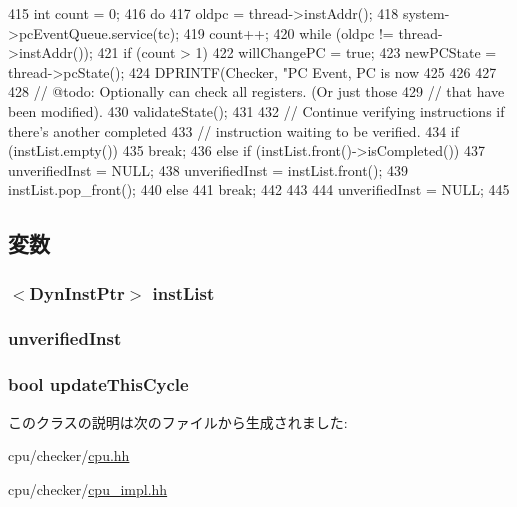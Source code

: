 \begin{DoxyCode}
{{{415             int count = 0;
416             do {
417                 oldpc = thread->instAddr();
418                 system->pcEventQueue.service(tc);
419                 count++;
420             } while (oldpc != thread->instAddr());
421             if (count > 1) {
422                 willChangePC = true;
423                 newPCState = thread->pcState();
424                 DPRINTF(Checker, "PC Event, PC is now %
425             }
426         }
427 
428         // @todo:  Optionally can check all registers. (Or just those
429         // that have been modified).
430         validateState();
431 
432         // Continue verifying instructions if there's another completed
433         // instruction waiting to be verified.
434         if (instList.empty()) {
435             break;
436         } else if (instList.front()->isCompleted()) {
437             unverifiedInst = NULL;
438             unverifiedInst = instList.front();
439             instList.pop_front();
440         } else {
441             break;
442         }
443     }
444     unverifiedInst = NULL;
445 }
\end{DoxyCode}


\subsection{変数}
\hypertarget{classChecker_ae10a391d02ce1ef67ee13cd82b7d46e5}{
\subsubsection[{instList}]{$<${\bf DynInstPtr}$>$ {\bf instList}}}
\label{classChecker_ae10a391d02ce1ef67ee13cd82b7d46e5}
\hypertarget{classChecker_a2d37ecd523121ea3770b0b2c4264dce4}{
\subsubsection[{unverifiedInst}]{ {\bf unverifiedInst}}}
\label{classChecker_a2d37ecd523121ea3770b0b2c4264dce4}
\hypertarget{classChecker_af852d5346faaffd68d81b10fee071300}{
\subsubsection[{updateThisCycle}]{\setlength{\rightskip}{0pt plus 5cm}bool {\bf updateThisCycle}}}
\label{classChecker_af852d5346faaffd68d81b10fee071300}


このクラスの説明は次のファイルから生成されました:\begin{DoxyCompactItemize}
\item 
cpu/checker/\hyperlink{checker_2cpu_8hh}{cpu.hh}\item 
cpu/checker/\hyperlink{checker_2cpu__impl_8hh}{cpu\_\-impl.hh}\end{DoxyCompactItemize}
